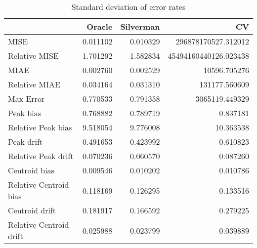 \begin{table}[H]
\centering
\begin{tabular}{lrrr}
  \hline
 & Oracle & Silverman & CV \\ 
  \hline
MISE & 0.011102 & 0.010329 & 296878170527.312012 \\ 
  Relative MISE & 1.701292 & 1.582834 & 45494160440126.023438 \\ 
  MIAE & 0.002760 & 0.002529 & 10596.705276 \\ 
  Relative MIAE & 0.034164 & 0.031310 & 131177.560609 \\ 
  Max Error & 0.770533 & 0.791358 & 3065119.449329 \\ 
  Peak bias & 0.768882 & 0.789719 & 0.837181 \\ 
  Relative Peak bias & 9.518054 & 9.776008 & 10.363538 \\ 
  Peak drift & 0.491653 & 0.423992 & 0.610823 \\ 
  Relative Peak drift & 0.070236 & 0.060570 & 0.087260 \\ 
  Centroid bias & 0.009546 & 0.010202 & 0.010786 \\ 
  Relative Centroid bias & 0.118169 & 0.126295 & 0.133516 \\ 
  Centroid drift & 0.181917 & 0.166592 & 0.279225 \\ 
  Relative Centroid drift & 0.025988 & 0.023799 & 0.039889 \\ 
   \hline
\end{tabular}
\caption{Standard deviation of error rates} 
\label{tbl:stddev_error_rates}
\end{table}
